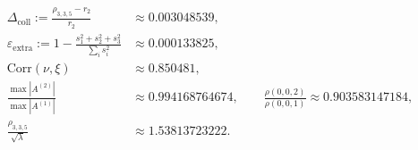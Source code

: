 \[
\begin{aligned}
\Delta_{\mathrm{coll}}:=\frac{\rho_{3,3,5}-r_2}{r_2}&\approx 0.003048539,\\
\varepsilon_{\mathrm{extra}}:=1-\frac{s_1^2+s_2^2+s_3^2}{\sum_i s_i^2}&\approx 0.000133825,\\
\mathrm{Corr}(\nu,\xi)&\approx 0.850481,\\
\frac{\max|A^{(2)}|}{\max|A^{(1)}|}&\approx 0.994168764674,\qquad\frac{\rho(0,0,2)}{\rho(0,0,1)}\approx 0.903583147184,\\
\frac{\rho_{3,3,5}}{\sqrt{\lambda}}&\approx 1.53813723222.
\end{aligned}
\]
